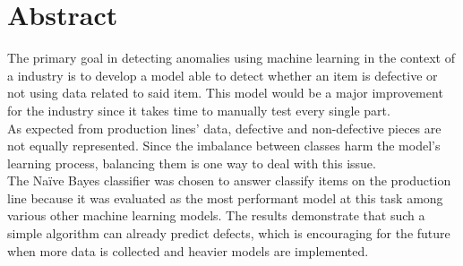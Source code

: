 \section*{Abstract}
The primary goal in detecting anomalies using machine learning in the context of a industry is to develop a model able to detect whether an item is defective or not using data related to said item. This model would be a major improvement for the industry since it takes time to manually test every single part.\\
As expected from production lines' data, defective and non-defective pieces are not equally represented. Since the imbalance between classes harm the model's learning process, balancing them is one way to deal with this issue.\\
The Naïve Bayes classifier was chosen to answer classify items on the production line because it was evaluated as the most performant model at this task among various other machine learning models. The results demonstrate that such a simple algorithm can already predict defects, which is encouraging for the future when more data is collected and heavier models are implemented.